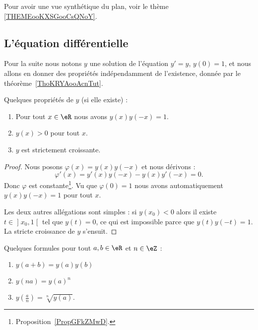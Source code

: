 Pour avoir une vue synthétique du plan, voir le thème \ref{THEMEooKXSGooCsQNoY}.

\subsection{L'équation différentielle}

Pour la suite nous notons \( y\) une solution de l'équation \( y'=y\), \( y(0)=1\), et nous allons en donner des propriétés indépendamment de l'existence, donnée par le théorème~\ref{ThoKRYAooAcnTut}.

\begin{proposition} \label{PropTLECooEiLbPP}
	Quelques propriétés de \( y\) (si elle existe) :
	\begin{enumerate}
		\item
		      Pour tout \( x\in \eR\) nous avons \( y(x)y(-x)=1\).
		\item
		      \( y(x)>0\) pour tout \( x\).
		\item
		      \( y\) est strictement croissante.
	\end{enumerate}
\end{proposition}

\begin{proof}
	Nous posons \( \varphi(x)=y(x)y(-x)\) et nous dérivons :
	\begin{equation}
		\varphi'(x)=y'(x)y(-x)-y(x)y'(-x)=0.
	\end{equation}
	Donc \( \varphi\) est constante\footnote{Proposition~\ref{PropGFkZMwD}.}. Vu que \( \varphi(0)=1\) nous avons automatiquement \( y(x)y(-x)=1\) pour tout \( x\).

	Les deux autres allégations sont simples : si \( y(x_0)<0\) alors il existe \( t\in\mathopen] x_0 , 1 \mathclose[\) tel que \( y(t)=0\), ce qui est impossible parce que \( y(t)y(-t)=1\). La stricte croissance de \( y\) s'ensuit.
\end{proof}

\begin{proposition}     \label{PROPooGGUIooExVHPM}
	Quelques formules pour tout \( a,b\in \eR\) et \( n\in \eZ\) :
	\begin{enumerate}
		\item       \label{ITEMooMPSUooWQpVQJ}
		      \( y(a+b)=y(a)y(b)\)
		\item
		      \( y(na)=y(a)^n\)
		\item
		      \( y\left( \frac{ a }{ n } \right)=\sqrt[n]{y(a)}\).
	\end{enumerate}
\end{proposition}

